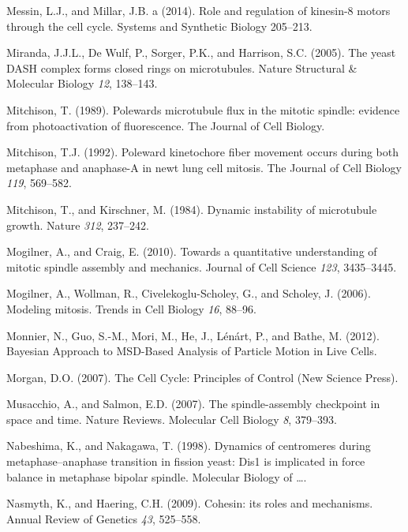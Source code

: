 \documentclass[12pt,a4paper,twoside,openright]{book}
\begin{document}
\hypertarget{ref-Messin2014}{}
Messin, L.J., and Millar, J.B. a (2014). Role and regulation of
kinesin-8 motors through the cell cycle. Systems and Synthetic Biology
205--213.

\hypertarget{ref-Miranda2005}{}
Miranda, J.J.L., De Wulf, P., Sorger, P.K., and Harrison, S.C. (2005).
The yeast DASH complex forms closed rings on microtubules. Nature
Structural \& Molecular Biology \emph{12}, 138--143.

\hypertarget{ref-Mitchison1989}{}
Mitchison, T. (1989). Polewards microtubule flux in the mitotic spindle:
evidence from photoactivation of fluorescence. The Journal of Cell
Biology.

\hypertarget{ref-Mitchison1992}{}
Mitchison, T.J. (1992). Poleward kinetochore fiber movement occurs
during both metaphase and anaphase-A in newt lung cell mitosis. The
Journal of Cell Biology \emph{119}, 569--582.

\hypertarget{ref-Mitchison1984}{}
Mitchison, T., and Kirschner, M. (1984). Dynamic instability of
microtubule growth. Nature \emph{312}, 237--242.

\hypertarget{ref-Mogilner2010}{}
Mogilner, A., and Craig, E. (2010). Towards a quantitative understanding
of mitotic spindle assembly and mechanics. Journal of Cell Science
\emph{123}, 3435--3445.

\hypertarget{ref-Mogilner2006a}{}
Mogilner, A., Wollman, R., Civelekoglu-Scholey, G., and Scholey, J.
(2006). Modeling mitosis. Trends in Cell Biology \emph{16}, 88--96.

\hypertarget{ref-Monnier2012}{}
Monnier, N., Guo, S.-M., Mori, M., He, J., Lénárt, P., and Bathe, M.
(2012). Bayesian Approach to MSD-Based Analysis of Particle Motion in
Live Cells.

\hypertarget{ref-Morgan2007}{}
Morgan, D.O. (2007). The Cell Cycle: Principles of Control (New Science
Press).

\hypertarget{ref-Musacchio2007}{}
Musacchio, A., and Salmon, E.D. (2007). The spindle-assembly checkpoint
in space and time. Nature Reviews. Molecular Cell Biology \emph{8},
379--393.

\hypertarget{ref-Nabeshima1998}{}
Nabeshima, K., and Nakagawa, T. (1998). Dynamics of centromeres during
metaphase--anaphase transition in fission yeast: Dis1 is implicated in
force balance in metaphase bipolar spindle. Molecular Biology of
\ldots{}.

\hypertarget{ref-Nasmyth2009}{}
Nasmyth, K., and Haering, C.H. (2009). Cohesin: its roles and
mechanisms. Annual Review of Genetics \emph{43}, 525--558.
\end{document}
